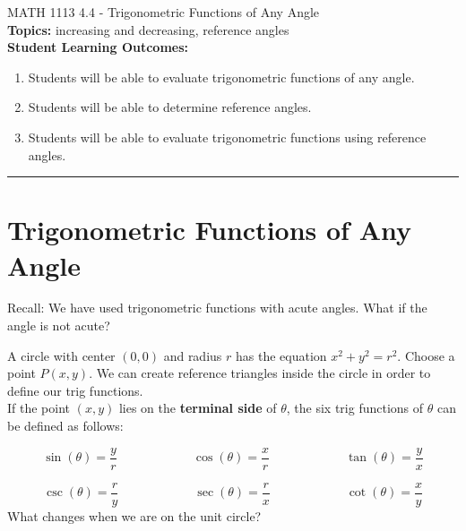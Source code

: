 \documentclass[11pt]{article}
\begin{document}
\noindent MATH 1113   \hfill 4.4 - Trigonometric Functions of Any Angle\\



\noindent \textbf{Topics:}  increasing and decreasing, reference angles\\

\noindent \textbf{Student Learning Outcomes:}
\begin{enumerate}
\item Students will be able to evaluate trigonometric functions of any angle.
\item Students will be able to determine reference angles.
\item Students will be able to evaluate trigonometric functions using reference angles.
\end{enumerate}

\hrule 
\vspace{5mm}
\section{Trigonometric Functions of Any Angle}
\noindent  Recall:  We have used trigonometric functions with acute angles.  What if the angle is not acute?\vfill

\noindent A circle with center $(0,0)$ and radius $r$ has the equation $x^2+y^2=r^2$.  Choose a point $P(x,y)$.  We can create reference triangles inside the circle in order to define our trig functions.\\[2.5in]


\noindent If the point $(x,y)$ lies on the \textbf{terminal side} of $\theta$, the six trig functions of $\theta$ can be defined as follows:

$$\sin(\theta)=\frac{y}{r} \quad \quad \quad \quad \quad \quad \cos(\theta)=\frac{x}{r} \quad \quad \quad \quad \quad \quad \tan(\theta)=\frac{y}{x} $$

$$\csc(\theta)=\frac{r}{y} \quad \quad \quad \quad \quad \quad \sec(\theta)=\frac{r}{x} \quad \quad \quad \quad \quad \quad \cot(\theta)=\frac{x}{y} $$
\vfill
\noindent What changes when we are on the unit circle?



\newpage
\end{document}
